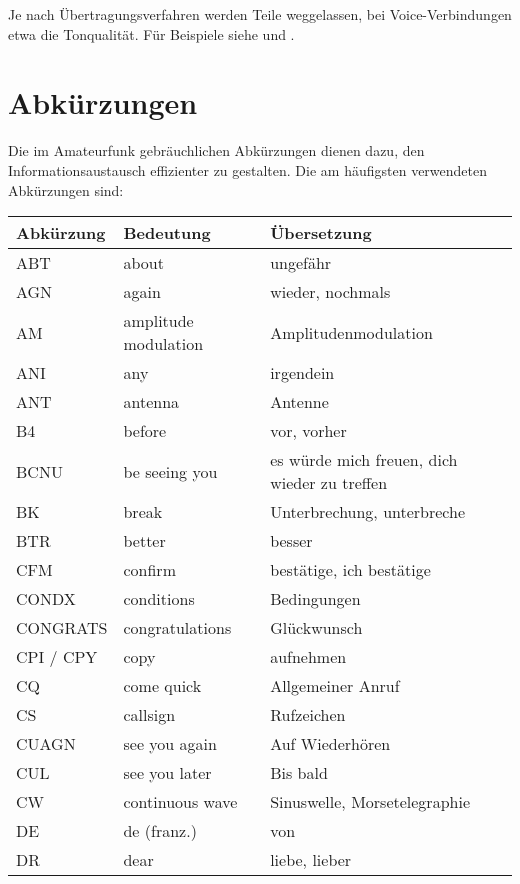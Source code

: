 Je nach Übertragungsverfahren werden Teile weggelassen, bei Voice-Verbindungen etwa die Tonqualität. Für Beispiele siehe  und .

\section{Abkürzungen}
Die im Amateurfunk gebräuchlichen Abkürzungen dienen dazu, den Informationsaustausch effizienter zu gestalten. Die am häufigsten verwendeten Abkürzungen sind:

{

\begin{longtabu} to \linewidth{lll}
\rowfont \bfseries Abkürzung & Bedeutung &  Übersetzung \\
\toprule
\endhead
{}
ABT & about & ungefähr \\ \midrule
AGN & again & wieder, nochmals \\ \midrule
AM & amplitude modulation & Amplitudenmodulation \\ \midrule
ANI & any & irgendein \\ \midrule
ANT & antenna & Antenne \\ \midrule
B4 & before & vor, vorher \\ \midrule
BCNU & be seeing you & es würde mich freuen, dich  wieder zu treffen \\ \midrule
BK & break & Unterbrechung, unterbreche \\ \midrule
BTR & better & besser \\ \midrule
CFM & confirm & bestätige, ich bestätige \\ \midrule
CONDX & conditions & Bedingungen \\ \midrule
CONGRATS & congratulations & Glückwunsch \\ \midrule
CPI / CPY & copy & aufnehmen \\ \midrule
CQ & come quick & Allgemeiner Anruf \\ \midrule
CS & callsign & Rufzeichen \\ \midrule
CUAGN & see you again & Auf Wiederhören \\ \midrule
CUL & see you later & Bis bald \\ \midrule
CW & continuous wave & Sinuswelle, Morsetelegraphie \\ \midrule
DE & de (franz.) & von \\ \midrule
DR & dear & liebe, lieber \\ \midrule

\end{longtabu}}
